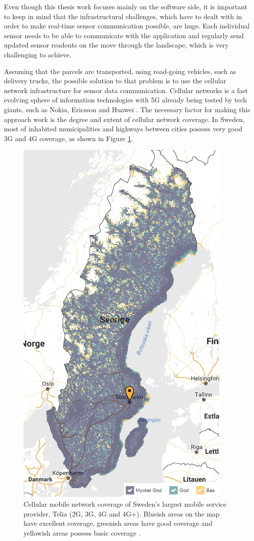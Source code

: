 Even though this thesis work focuses mainly on the software side, it is important to keep in mind that the infrastructural challenges, which have to dealt with in order to make real-time sensor communication possible, are huge. Each individual sensor needs to be able to communicate with the application and regularly send updated sensor readouts on the move through the landscape, which is very challenging to achieve.

Assuming that the parcels are transported, using road-going vehicles, such as delivery trucks, the possible solution to that problem is to use the cellular network infrastructure for sensor data communication. Cellular networks is a fast evolving sphere of information technologies with 5G already being tested by tech giants, such as Nokia, Ericsson and Huawei \citep{5gtesting}. The necessary factor for making this approach work is the degree and extent of cellular network coverage. In Sweden, most of inhabited municipalities and highways between cities possess very good 3G and 4G coverage, as shown in Figure \ref{fig:4gcoverage}. 

\begin{figure}[H]
\centering
\includegraphics[scale=0.68]{images/4gcoverage.png}
\caption{Cellular mobile network coverage of Sweden's largest mobile service provider, Telia (2G, 3G, 4G and 4G+). Blueish areas on the map have excellent coverage, greenish areas have good coverage and yellowish areas possess basic coverage \textnormal{\citep{teliacoverage}}.}
\label{fig:4gcoverage}
\end{figure}


